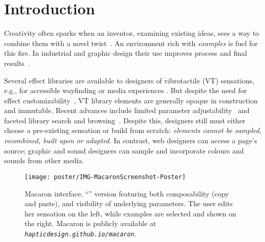 \section{Introduction}

Creativity often sparks when an inventor, examining existing ideas, sees a way to combine them with a novel twist~\cite{Warr2005}.
An environment rich with \emph{examples} is fuel for this fire. In industrial and graphic design \cite{Buxton2007,Herring2009} their use improves process and final results~\cite{Dow2011,Lee2010a}.

Several effect libraries are available to designers of vibrotactile (VT) sensations, e.g., for accessible wayfinding \cite{Zelek2003} or %
media experiences \cite{SchneiderAsiaHaptics2014,Israr2014,ImmersionCorporation,Culbertson2014}. 
But despite the need for effect customizability~\cite{Seifi2014}, VT library elements are generally opaque in construction and immutable.
Recent advances include limited parameter adjustability~\cite{Israr2014,SchneiderAsiaHaptics2014} and faceted library search and browsing~\cite{Seifi2015}. 
Despite this, designers still must either choose a pre-existing sensation or build from scratch:
\textit{elements cannot be sampled, recombined, built upon or adapted}. %
In contrast, web designers can access a page's source;
graphic and sound designers can sample and incorporate colours and sounds from other media.



\begin{figure}
        \centering
        \texttt{[image: poster/IMG-MacaronScreenshot-Poster]}
        \caption{Macaron interface, ``\hi'' version featuring both composability (copy and paste), and visibility of underlying parameters. The user edits her sensation on the left, while examples are selected and shown on the right. 
        Macaron is publicly available at \emph{{\tt hapticdesign.github.io/macaron}}.
}
        \label{fig:macaron:hi}
\end{figure}




